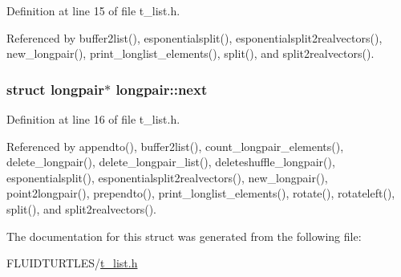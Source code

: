 Definition at line 15 of file t\-\_\-list.\-h.



Referenced by buffer2list(), esponentialsplit(), esponentialsplit2realvectors(), new\-\_\-longpair(), print\-\_\-longlist\-\_\-elements(), split(), and split2realvectors().

\hypertarget{structlongpair_a022c0552d55e1807ca6d7f187fdf9f38}{
\subsubsection[{next}]{\setlength{\rightskip}{0pt plus 5cm}struct {\bf longpair}$\ast$ longpair\-::next}}\label{structlongpair_a022c0552d55e1807ca6d7f187fdf9f38}


Definition at line 16 of file t\-\_\-list.\-h.



Referenced by appendto(), buffer2list(), count\-\_\-longpair\-\_\-elements(), delete\-\_\-longpair(), delete\-\_\-longpair\-\_\-list(), deleteshuffle\-\_\-longpair(), esponentialsplit(), esponentialsplit2realvectors(), new\-\_\-longpair(), point2longpair(), prependto(), print\-\_\-longlist\-\_\-elements(), rotate(), rotateleft(), split(), and split2realvectors().



The documentation for this struct was generated from the following file\-:\begin{DoxyCompactItemize}
\item 
F\-L\-U\-I\-D\-T\-U\-R\-T\-L\-E\-S/\hyperlink{t__list_8h}{t\-\_\-list.\-h}\end{DoxyCompactItemize}
